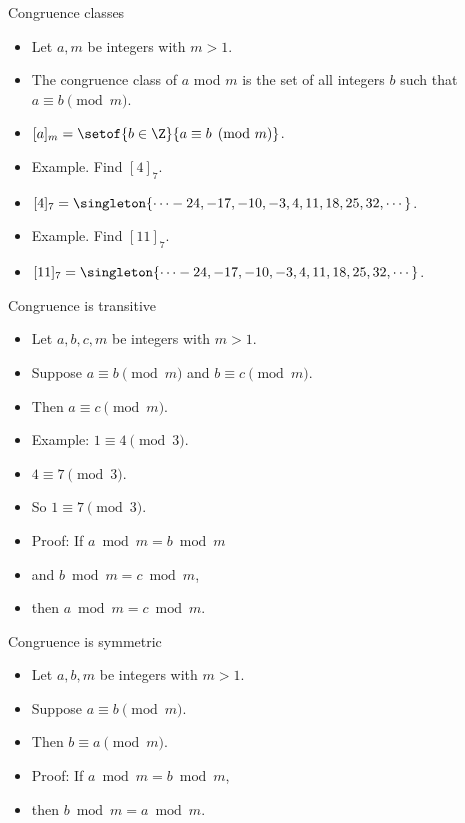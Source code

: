 \documentclass{beamer}
\begin{document}
\begin{frame}{Congruence classes}

\begin{itemize}
  \item  Let $a,m$ be integers with $m>1$.
  \item The congruence class of $a$ mod $m$ is the set of all integers $b$ such that $a\equiv b \pmod m$.
  \item $[a]_m = \setof{b\in\Z}{a\equiv b \pmod m}$.
  \item Example. Find $[4]_7$.
  \item $[4]_7 = \singleton{\cdots -24, -17, -10, -3, 4, 11, 18, 25, 32, \cdots}$.
  \item Example. Find $[11]_7$.
  \item $[11]_7 = \singleton{\cdots -24, -17, -10, -3, 4, 11, 18, 25, 32, \cdots}$.
\end{itemize}

\end{frame}

\begin{frame}{Congruence is transitive}

\begin{itemize}
  \item  Let $a,b,c,m$ be integers with $m>1$.
  \item Suppose $a\equiv b \pmod m$ and $b \equiv c \pmod m$.
  \item Then $a\equiv c \pmod m$.
  \item Example: $1 \equiv 4 \pmod 3$.
  \item $4 \equiv 7 \pmod 3$.
  \item So $1 \equiv 7 \pmod 3$.
  \item Proof: If $a \bmod m = b \bmod m$
  \item and $b \bmod m = c \bmod m$,
  \item then $a\bmod m = c \bmod m$.
\end{itemize}

\end{frame}


\begin{frame}{Congruence is symmetric}

\begin{itemize}
  \item  Let $a,b,m$ be integers with $m>1$.
  \item Suppose $a\equiv b \pmod m$.
  \item Then $b\equiv a \pmod m$.
  \item Proof: If $a \bmod m = b \bmod m$,
  \item then $b\bmod m = a \bmod m$.
\end{itemize}

\end{frame}
\end{document}
